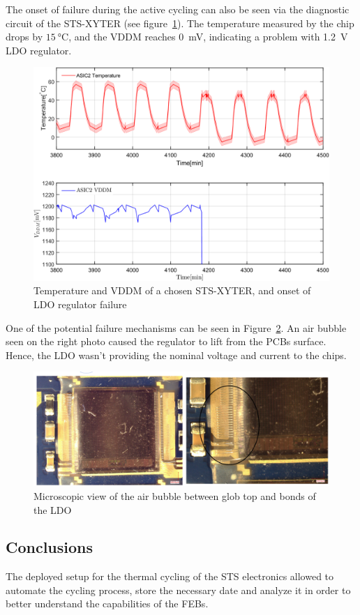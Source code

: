 The onset of failure during the active cycling can also be seen via the diagnostic circuit of the STS-XYTER (see figure~\ref{fig_active_failure}). The temperature measured by the chip drops by $\SI{15}{\celsius}$, and the VDDM reaches 0~mV, indicating a problem with 1.2~V \gls{LDO} regulator. 

\begin{figure}[!h]
\centering
\includegraphics[width=0.6\columnwidth]{Chapter4/images/FEB2ASIC2COMP1.png}
\caption{Temperature and VDDM of a chosen STS-XYTER, and onset of \gls{LDO} regulator failure}
\label{fig_active_failure}
\end{figure}

One of the potential failure mechanisms can be seen in Figure~\ref{fig_ldo_lift}. An air bubble seen on the right photo caused the regulator to lift from the \glspl{PCB} surface. Hence, the \gls{LDO} wasn't providing the nominal voltage and current to the chips. 

\begin{figure}[!h]
\centering
\includegraphics[width=0.8\columnwidth]{Chapter4/images/FEB_81_LDO_lift.png}
\caption{Microscopic view of the air bubble between glob top and bonds of the \gls{LDO}}
\label{fig_ldo_lift}
\end{figure}
\newpage
\subsection{Conclusions}
The deployed setup for the thermal cycling of the \gls{STS} electronics allowed to automate the cycling process, store the necessary date and analyze it in order to better understand the capabilities of the \glspl{FEB}.

